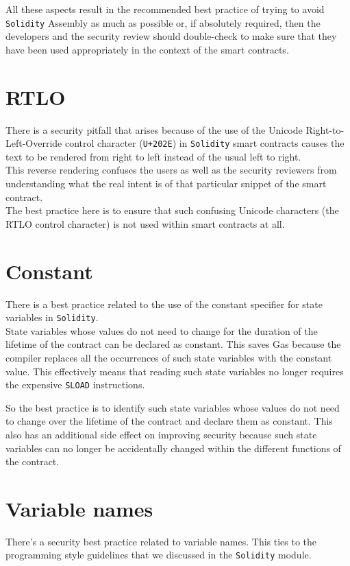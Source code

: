 All these aspects result in the recommended best practice of trying to avoid \texttt{Solidity} Assembly as much as possible or, if absolutely required, then the developers and the security review should double-check to make sure that they have been used appropriately in the context of the smart contracts.

\section{RTLO}
There is a security pitfall that arises because of the use of the Unicode Right-to-Left-Override control character (\texttt{U+202E}) in \texttt{Solidity} smart contracts causes the text to be rendered from right to left instead of the usual left to right.\\

This reverse rendering confuses the users as well as the security reviewers from understanding what the real intent is of that particular snippet of the smart contract. \\

The best practice here is to ensure that such confusing Unicode characters (the RTLO control character) is not used within smart contracts at all.

\section{Constant}
There is a best practice related to the use of the constant specifier for state variables in \texttt{Solidity}. \\

State variables whose values do not need to change for the duration of the lifetime of the contract can be declared as constant. This saves Gas because the compiler replaces all the occurrences of such state variables with the constant value. This effectively means that reading such state variables no longer requires the expensive \texttt{SLOAD} instructions.

So the best practice is to identify such state variables whose values do not need to change over the lifetime of the contract and declare them as constant. This also has an additional side effect on improving security because such state variables can no longer be accidentally changed within the different functions of the contract.

\section{Variable names}
There's a security best practice related to variable names. This ties to the programming style guidelines that we discussed in the \texttt{Solidity} module. \\

